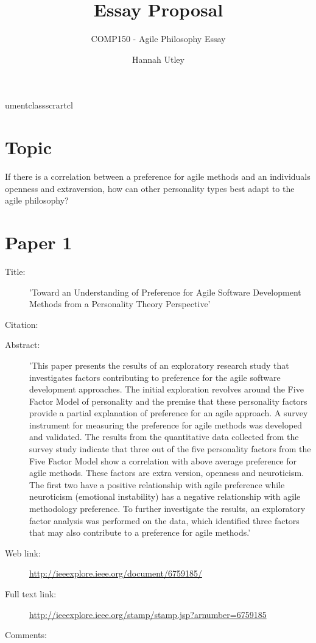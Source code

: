umentclass{scrartcl}

\usepackage[hidelinks]{hyperref}
\usepackage[none]{hyphenat}

\title{Essay Proposal}
\subtitle{COMP150 - Agile Philosophy Essay}

\author{Hannah Utley}



\maketitle

\section*{Topic}

If there is a correlation between a preference for agile methods and an individuals openness and extraversion, how can other personality types best adapt to the agile philosophy?

\section*{Paper 1}
\begin{description}
\item[Title:] 'Toward an Understanding of Preference for Agile Software Development Methods from a Personality Theory Perspective'
\item[Citation:] \cite{Paper1}
\item[Abstract:] 'This paper presents the results of an exploratory research study that investigates factors contributing to preference for the agile software development approaches. The initial exploration revolves around the Five Factor Model of personality and the premise that these personality factors provide a partial explanation of preference for an agile approach. A survey instrument for measuring the preference for agile methods was developed and validated. The results from the quantitative data collected from the survey study indicate that three out of the five personality factors from the Five Factor Model show a correlation with above average preference for agile methods. These factors are extra version, openness and neuroticism. The first two have a positive relationship with agile preference while neuroticism (emotional instability) has a negative relationship with agile methodology preference. To further investigate the results, an exploratory factor analysis was performed on the data, which identified three factors that may also contribute to a preference for agile methods.'
\item[Web link:] \url{http://ieeexplore.ieee.org/document/6759185/}
\item[Full text link:] \url{http://ieeexplore.ieee.org/stamp/stamp.jsp?arnumber=6759185}
\item[Comments:] 
\end{description}

